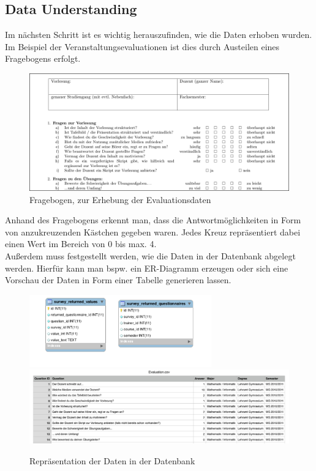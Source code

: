 \subsection{Data Understanding}
\label{sec:example:data:du}

Im nächsten Schritt ist es wichtig herauszufinden, wie die Daten erhoben wurden.
Im Beispiel der Veranstaltungsevaluationen ist dies durch Austeilen eines
Fragebogens erfolgt.

\begin{figure}[htb]
	\includegraphics[width=\textwidth]{gfx/questionnaire.png}
	\caption{Fragebogen, zur Erhebung der Evaluationsdaten}
	\label{fig:example:data:du:qu}
\end{figure}

Anhand des Fragebogens erkennt man, dass die Antwortmöglichkeiten in Form von
anzukreuzenden Kästchen gegeben waren. Jedes Kreuz repräsentiert dabei einen
Wert im Bereich von 0 bis max. 4. \\
Außerdem muss festgestellt werden, wie die Daten in der Datenbank abgelegt
werden. Hierfür kann man bspw. ein ER-Diagramm erzeugen oder sich eine Vorschau
der Daten in Form einer Tabelle generieren lassen.

\begin{figure}[htb]
  \center
	\includegraphics[width=0.7\textwidth]{gfx/db1.png}
  \includegraphics[width=\textwidth]{gfx/db2.png}
	\caption{Repräsentation der Daten in der Datenbank}
	\label{fig:example:data:du:db}
\end{figure}

